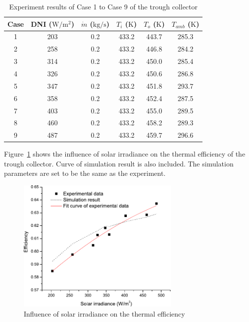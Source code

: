 \begin{table}[htbp]\footnotesize
	\caption{Experiment results of Case 1 to Case 9 of the trough collector}
	\begin{center}
	\begin{tabular}{cccccc}
		\toprule
		Case	& DNI ($\mathrm{W/m^2}$)	&	$\dot{m}$ ($\mathrm{kg/s}$)			&	$T_i$ ($\mathrm{K}$)	&	$T_o$ ($\mathrm{K}$)		&	$T_{amb}$ ($\mathrm{K}$)\\
		\midrule
		1	&	203	&	0.2	&	433.2	&	443.7	&	285.3\\
		2	&	258	&	0.2	&	433.2	&	446.8	&	284.2\\
		3	&	314	&	0.2	&	433.2	&	450.0	&	285.4	\\
		4	&	326	&	0.2	&	433.2	&	450.6	&	286.8\\
		5	&	347	&	0.2	&	433.2	&	451.8	&	293.7\\
		6	&	358	&	0.2	&	433.2	&	452.4	&	287.5\\
		7	&	403	&	0.2	&	433.2	&	455.0	&	289.5\\
		8	&	460	&	0.2	&	433.2	&	458.2	&	289.3\\
		9	&	487	&	0.2	&	433.2	&	459.7	&	296.6\\
		\bottomrule
	\end{tabular}
	\end{center}
	\label{tab:ResultOfTrough1}
\end{table}

Figure~\ref{fig:I_r-eta-trough} shows the influence of solar irradiance on the thermal efficiency of the trough collector. Curve of simulation result is also included. The simulation parameters are set to be the same as the experiment. 
\begin{figure}[!ht]
\centering
\includegraphics[width=0.7\textwidth]{fig/I_r-eta-trough}
\caption{Influence of solar irradiance on the thermal efficiency}
\label{fig:I_r-eta-trough}
\end{figure}


